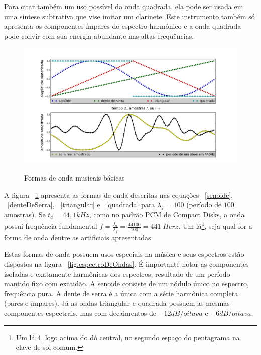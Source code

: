 Para citar também um uso possível da onda quadrada, ela pode ser usada em uma síntese
subtrativa que vise imitar um clarinete. Este instrumento também só apresenta os
componentes ímpares do espectro harmônico e a onda quadrada pode convir com sua energia abundante nas altas frequências.



\begin{figure}[h!]
    \centering
    \caption{Formas de onda musicais básicas}
        \includegraphics[width=\textwidth]{figuras/formasDeOnda6}
        \label{fig:formasDeOnda}
\end{figure}



A figura ~\ref{fig:formasDeOnda} apresenta
as formas de onda descritas nas equações ~\ref{senoide}, ~\ref{denteDeSerra}, ~\ref{triangular} e ~\ref{quadrada} para $\lambda_f=100$ (período
de $100$ amostras).
Se $t_a=44,1 kHz$, como no padrão PCM de Compact Disks, a onda possui frequência fundamental $f=\frac{f_a}{\lambda_f}=\frac{44100}{100} = 441 \; Herz $. Um lá\footnote{Um lá 4, logo acima do dó central, no segundo espaço do pentagrama na clave de sol comum.}, seja qual for a forma de onda dentre as artificiais apresentadas.

Estas formas de onda possuem usos especiais na música e seus espectros estão dispostos na figura ~\ref{fig:espectroDeOndas}. É importante notar as componentes isoladas e exatamente harmônicas dos espectros,
resultado de um período mantido fixo com exatidão. A senoide consiste de um nódulo único no espectro, frequência pura. A dente de serra é a única com a série harmônica completa (pares e ímpares). Já as ondas triangular e quadrada possuem as mesmas componentes espectrais, mas com decaimentos de $-12dB/oitava$ e $-6dB/oitava$.

